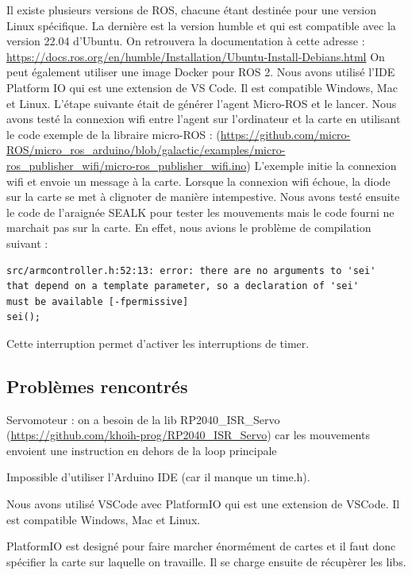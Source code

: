 Il existe plusieurs versions de ROS, chacune étant destinée pour une version Linux spécifique. 
La dernière est la version humble et qui est compatible avec la version 22.04 d’Ubuntu.  
On retrouvera la documentation à cette adresse : \url{https://docs.ros.org/en/humble/Installation/Ubuntu-Install-Debians.html}
On peut également utiliser une image Docker pour ROS 2. 
\linebreak
Nous avons utilisé l’IDE Platform IO qui est une extension de VS Code. 
Il est compatible Windows, Mac et Linux. L’étape suivante était de générer l’agent Micro-ROS et le lancer.  
Nous avons testé la connexion wifi entre l’agent sur l’ordinateur et la carte en utilisant le code exemple de la libraire micro-ROS : 
(\url{https://github.com/micro-ROS/micro_ros_arduino/blob/galactic/examples/micro-ros_publisher_wifi/micro-ros_publisher_wifi.ino}) 
L’exemple initie la connexion wifi et envoie un message à la carte. Lorsque la connexion wifi échoue, la diode sur la carte se 
met à clignoter de manière intempestive. Nous avons testé ensuite le code de l’araignée SEALK pour tester les mouvements mais le code 
fourni ne marchait pas sur la carte. En effet, nous avions le problème de compilation suivant :  

\begin{lstlisting}
src/armcontroller.h:52:13: error: there are no arguments to 'sei' 
that depend on a template parameter, so a declaration of 'sei' 
must be available [-fpermissive]
sei();
\end{lstlisting}
Cette interruption permet d'activer les interruptions de timer.

			\subsection{Problèmes rencontrés}

Servomoteur : on a besoin de la lib RP2040\_ISR\_Servo (\url{https://github.com/khoih-prog/RP2040_ISR_Servo}) car les mouvements envoient une instruction en dehors de la loop principale

Impossible d'utiliser l'Arduino IDE (car il manque un time.h).

Nous avons utilisé VSCode avec PlatformIO qui est une extension de VSCode. Il est compatible Windows, Mac et Linux.

PlatformIO est designé pour faire marcher énormément de cartes et il faut donc spécifier la carte sur laquelle on travaille. Il se charge ensuite de récupèrer les libs.


